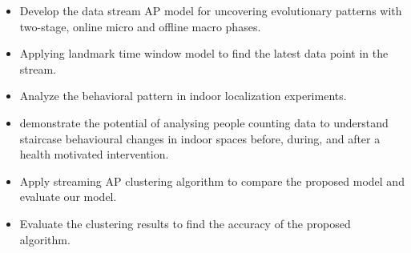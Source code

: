 \begin{itemize}
    \item Develop the data stream AP model for uncovering evolutionary patterns with two-stage, online micro and offline macro phases.
     \item Applying landmark time window model to find the latest data point in the stream.
   
    \item Analyze the behavioral pattern in indoor localization experiments.
    \item demonstrate the potential of analysing people counting data to understand staircase behavioural changes in indoor spaces before, during, and after a health motivated intervention.
    \item Apply streaming AP clustering algorithm to compare the proposed model and evaluate our model.
    \item Evaluate the clustering results to find the accuracy of the proposed algorithm.




\end{itemize}
 




